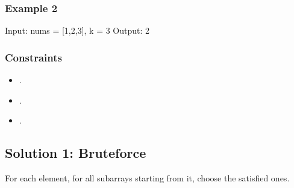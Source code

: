 \documentclass[letterpaper,12pt,english]{book}
\begin{document}
\subsubsection{Example 2}
\label{\detokenize{Prefix_Sum/560_Subarray_Sum_Equals_K:example-2}}
\begin{sphinxVerbatim}[commandchars=\\\{\}]
Input: nums = [1,2,3], k = 3
Output: 2
\end{sphinxVerbatim}


\subsubsection{Constraints}
\label{\detokenize{Prefix_Sum/560_Subarray_Sum_Equals_K:constraints}}\begin{itemize}
\item {} 
\sphinxAtStartPar
{}.

\item {} 
\sphinxAtStartPar
{}.

\item {} 
\sphinxAtStartPar
{}.

\end{itemize}


\subsection{Solution 1: Bruteforce}
\label{\detokenize{Prefix_Sum/560_Subarray_Sum_Equals_K:solution-1-bruteforce}}
\sphinxAtStartPar
For each element, for all subarrays starting from it, choose the satisfied ones.
\end{document}
